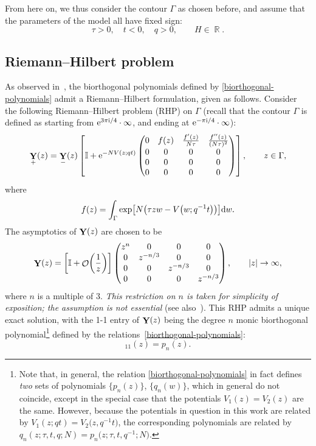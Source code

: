 \documentclass[10pt,a4paper]{amsart}
\DeclareMathOperator{\RR}{\mathbb{R}}
\DeclareMathOperator{\OO}{\mathcal{O}}
\DeclareMathOperator{\YY}{{\bf Y}}
\numberwithin{equation}{section}
\begin{document}
From here on, we thus consider the contour $\Gamma$ as chosen before, and assume that the parameters of the model all have fixed sign:
 \begin{equation*}
 \tau >0,\quad t < 0, \quad q >0, \qquad H\in \RR.
 \end{equation*}

\subsection{Riemann--Hilbert problem}

As observed in~\cite{KM}, the biorthogonal polynomials defined by \eqref{biorthogonal-polynomials} admit a Riemann--Hilbert formulation, given as follows.
Consider the following Riemann--Hilbert problem (RHP) on $\Gamma$ (recall that the contour $\Gamma$ is defined as starting from
${\rm e}^{3\pi {\rm i}/4}\cdot \infty$, and ending at ${\rm e}^{-\pi {\rm i}/4}\cdot\infty$):
 \begin{equation*} %
 \YY_{+}(z) = \YY_{-}(z) \left[\mathbb{I} + {\rm e}^{-NV(z;q t)}\begin{pmatrix}
 0 & f(z) & \frac{f'(z)}{N\tau} & \frac{f''(z)}{(N\tau)^2} \\
 0 & 0 & 0 & 0 \\
 0 & 0 & 0 & 0 \\
 0 & 0 & 0 & 0
 \end{pmatrix} \right]
, \qquad z \in \Gamma,
 \end{equation*}
where
 \begin{equation*}
 f(z) = \int_{\Gamma} \exp\bigl[ N\bigl(\tau z w - V\bigl(w;q^{-1}t\bigr) \bigr)\bigr] {\rm d}w.
 \end{equation*}
The asymptotics of $\YY(z)$ are chosen to be
 \begin{equation*}
 \YY(z) = \biggl[ \mathbb{I} + \OO\biggl(\frac{1}{z}\biggr) \biggr]
 \begin{pmatrix}
 z^n & 0 & 0 & 0 \\
 0 & z^{-n/3} & 0 & 0 \\
 0 & 0 & z^{-n/3} & 0 \\
 0 & 0 & 0 & z^{-n/3}
 \end{pmatrix}, \qquad |z| \to \infty,
 \end{equation*}
where $n$ is a multiple of $3$. \emph{This restriction on $n$ is taken for simplicity of exposition; the assumption is not essential} (see also~\cite{DK1,DKM}). This RHP admits a unique exact solution, with the 1-1 entry of $\YY(z)$ being the degree $n$ monic biorthogonal polynomial\footnote{Note that, in general, the relation \eqref{biorthogonal-polynomials} in fact defines \textit{two} sets of polynomials $\{p_n(z)\}$, $\{q_n(w)\}$, which in general do not coincide, except in the special case that the potentials $V_ 1(z) = V_2(z)$ are the same. However, because the potentials in question in this work are related by $V_1(z;qt) = V_2\bigl(z,q^{-1}t\bigr)$, the corresponding polynomials are related by $q_n(z;\tau,t,q;N) = p_n\bigl(z;\tau,t,q^{-1};N\bigr)$. } defined by the relations~\eqref{biorthogonal-polynomials}:
 \begin{equation*}
 [\YY]_{11}(z) = p_n(z).
 \end{equation*}
\end{document}
